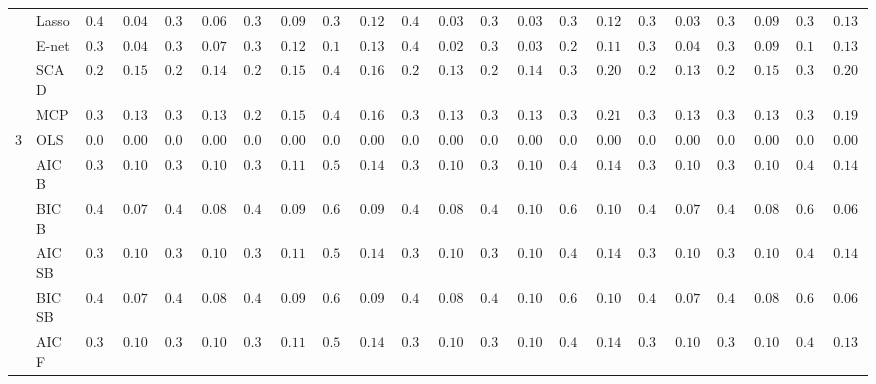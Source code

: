 \begin{tabular}{p{0.2cm}p{1cm}|p{0.6cm}p{0.6cm}|p{0.6cm}p{0.6cm}p{0.6cm}p{0.6cm}p{0.6cm}p{0.6cm}|p{0.6cm}p{0.6cm}p{0.6cm}p{0.6cm}p{0.6cm}p{0.6cm}|p{0.6cm}p{0.6cm}p{0.6cm}p{0.6cm}p{0.6cm}p{0.6cm}}
 & Lasso  & $0.400$ & $0.0402$ & $0.382$ & $0.0642$ & $0.340$ & $0.0964$ & $0.342$ & $0.1281$ & $0.402$ & $0.0348$ & $0.394$ & $0.0343$ & $0.322$ & $0.1203$ & $0.392$ & $0.0394$ & $0.354$ & $0.0937$ & $0.320$ & $0.1393$ \\
 & E-net  & $0.396$ & $0.0400$ & $0.368$ & $0.0790$ & $0.308$ & $0.1220$ & $0.186$ & $0.1311$ & $0.400$ & $0.0284$ & $0.392$ & $0.0394$ & $0.282$ & $0.1140$ & $0.388$ & $0.0477$ & $0.342$ & $0.0997$ & $0.198$ & $0.1348$ \\
 & SCAD  & $0.264$ & $0.1501$ & $0.280$ & $0.1421$ & $0.278$ & $0.1501$ & $0.446$ & $0.1654$ & $0.280$ & $0.1363$ & $0.276$ & $0.1471$ & $0.320$ & $0.2089$ & $0.276$ & $0.1386$ & $0.286$ & $0.1511$ & $0.312$ & $0.2016$ \\
 & MCP  & $0.308$ & $0.1376$ & $0.316$ & $0.1369$ & $0.292$ & $0.1542$ & $0.448$ & $0.1660$ & $0.318$ & $0.1336$ & $0.302$ & $0.1378$ & $0.324$ & $0.2104$ & $0.312$ & $0.1373$ & $0.316$ & $0.1339$ & $0.330$ & $0.1977$ \\\hline
3 & OLS  & $0.000$ & $0.0000$ & $0.000$ & $0.0000$ & $0.000$ & $0.0000$ & $0.000$ & $0.0000$ & $0.000$ & $0.0000$ & $0.000$ & $0.0000$ & $0.000$ & $0.0000$ & $0.000$ & $0.0000$ & $0.000$ & $0.0000$ & $0.000$ & $0.0000$ \\
 & AIC B  & $0.338$ & $0.1013$ & $0.326$ & $0.1050$ & $0.354$ & $0.1132$ & $0.504$ & $0.1435$ & $0.324$ & $0.1093$ & $0.338$ & $0.1052$ & $0.438$ & $0.1469$ & $0.328$ & $0.1083$ & $0.350$ & $0.1040$ & $0.458$ & $0.1485$ \\
 & BIC B  & $0.430$ & $0.0718$ & $0.436$ & $0.0823$ & $0.468$ & $0.0952$ & $0.652$ & $0.0926$ & $0.448$ & $0.0858$ & $0.454$ & $0.1058$ & $0.600$ & $0.1025$ & $0.422$ & $0.0799$ & $0.452$ & $0.0882$ & $0.606$ & $0.0600$ \\
 & AIC SB  & $0.338$ & $0.1013$ & $0.326$ & $0.1050$ & $0.354$ & $0.1132$ & $0.504$ & $0.1435$ & $0.324$ & $0.1093$ & $0.338$ & $0.1052$ & $0.438$ & $0.1469$ & $0.328$ & $0.1083$ & $0.350$ & $0.1040$ & $0.458$ & $0.1485$ \\
 & BIC SB  & $0.430$ & $0.0718$ & $0.436$ & $0.0823$ & $0.468$ & $0.0952$ & $0.652$ & $0.0926$ & $0.448$ & $0.0858$ & $0.454$ & $0.1058$ & $0.600$ & $0.1025$ & $0.422$ & $0.0799$ & $0.452$ & $0.0882$ & $0.606$ & $0.0600$ \\
 & AIC F  & $0.338$ & $0.1013$ & $0.328$ & $0.1045$ & $0.356$ & $0.1122$ & $0.520$ & $0.1421$ & $0.326$ & $0.1088$ & $0.344$ & $0.1028$ & $0.484$ & $0.1454$ & $0.330$ & $0.1078$ & $0.354$ & $0.1058$ & $0.492$ & $0.1316$ \\

\end{tabular}
